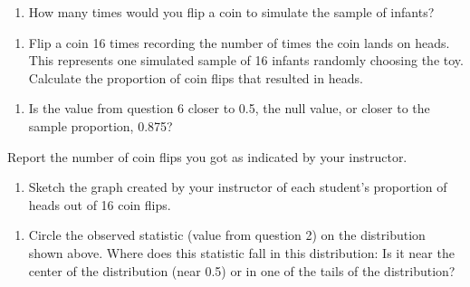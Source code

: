 \documentclass[
]{report}
\providecommand{\tightlist}{%
  \setlength{\itemsep}{0pt}\setlength{\parskip}{0pt}}
\begin{document}
\begin{enumerate}
\def\labelenumi{\arabic{enumi}.}
\setcounter{enumi}{4}
\tightlist
\item
  How many times would you flip a coin to simulate the sample of infants?
\end{enumerate}

\vspace{0.2in}

\begin{enumerate}
\def\labelenumi{\arabic{enumi}.}
\setcounter{enumi}{5}
\tightlist
\item
  Flip a coin 16 times recording the number of times the coin lands on heads. This represents one simulated sample of 16 infants randomly choosing the toy. Calculate the proportion of coin flips that resulted in heads.
\end{enumerate}

\vspace{0.2in}

\begin{enumerate}
\def\labelenumi{\arabic{enumi}.}
\setcounter{enumi}{6}
\tightlist
\item
  Is the value from question 6 closer to 0.5, the null value, or closer to the sample proportion, 0.875?
\end{enumerate}

\vspace{0.2in}

Report the number of coin flips you got as indicated by your instructor.

\begin{enumerate}
\def\labelenumi{\arabic{enumi}.}
\setcounter{enumi}{7}
\tightlist
\item
  Sketch the graph created by your instructor of each student's proportion of heads out of 16 coin flips.
\end{enumerate}

\vspace{2in}

\begin{enumerate}
\def\labelenumi{\arabic{enumi}.}
\setcounter{enumi}{8}
\tightlist
\item
  Circle the observed statistic (value from question 2) on the distribution shown above. Where does this statistic fall in this distribution: Is it near the center of the distribution (near 0.5) or in one of the tails of the distribution?
\end{enumerate}

\vspace{0.2in}
\end{document}
